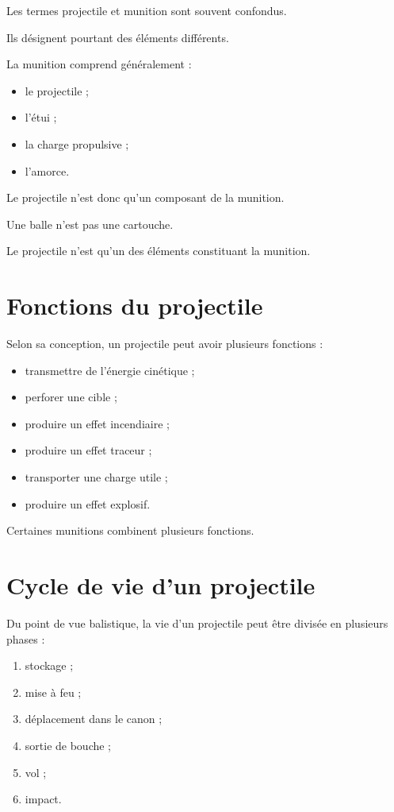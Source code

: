 Les termes projectile et munition sont souvent confondus.

Ils désignent pourtant des éléments différents.

La munition comprend généralement :

\begin{itemize}
    \item le projectile ;
    \item l'étui ;
    \item la charge propulsive ;
    \item l'amorce.
\end{itemize}

Le projectile n'est donc qu'un composant de la munition.

\begin{aretenir}

Une balle n'est pas une cartouche.

Le projectile n'est qu'un des éléments constituant la munition.

\end{aretenir}

\section{Fonctions du projectile}

Selon sa conception, un projectile peut avoir plusieurs fonctions :

\begin{itemize}
    \item transmettre de l'énergie cinétique ;
    \item perforer une cible ;
    \item produire un effet incendiaire ;
    \item produire un effet traceur ;
    \item transporter une charge utile ;
    \item produire un effet explosif.
\end{itemize}

Certaines munitions combinent plusieurs fonctions.

\section{Cycle de vie d'un projectile}

Du point de vue balistique, la vie d'un projectile peut être divisée en
plusieurs phases :

\begin{enumerate}
    \item stockage ;
    \item mise à feu ;
    \item déplacement dans le canon ;
    \item sortie de bouche ;
    \item vol ;
    \item impact.
\end{enumerate}

